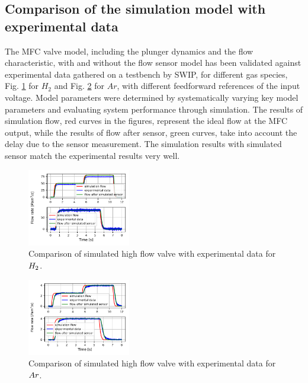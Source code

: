 \documentclass[letterpaper, 10pt, conference]{ieeeconf}
\begin{document}
\subsection{Comparison of the simulation model with experimental data}
The MFC valve model, including the plunger dynamics and the flow characteristic, with and without the flow sensor model has been validated against experimental data gathered on a testbench by SWIP, for different gas species, Fig. \ref{fig:mdl_H2} for $H_2$ and Fig. \ref{fig:mdl_Ar} for $Ar$, with different feedforward references of the input voltage. Model parameters were determined by systematically varying key model parameters and evaluating system performance through simulation. The results of simulation flow, red curves in the figures, represent the ideal flow at the MFC output, while the results of flow after sensor, green curves, take into account the delay due to the sensor measurement. The simulation results with simulated sensor match the experimental results very well. 

\begin{figure}[!ht]
    \centering
    \includegraphics[width=0.4\textwidth]{H2_model.pdf}
    \caption{Comparison of simulated high flow valve with experimental data for \protect$H_2\protect$. }
    \label{fig:mdl_H2}
\end{figure}

\begin{figure}[!ht]
    \centering
    \includegraphics[width=0.4\textwidth]{Ar_model.pdf}
    \caption{Comparison of simulated high flow valve with experimental data for \protect$Ar\protect$.}
    \label{fig:mdl_Ar}
\end{figure}
\end{document}

